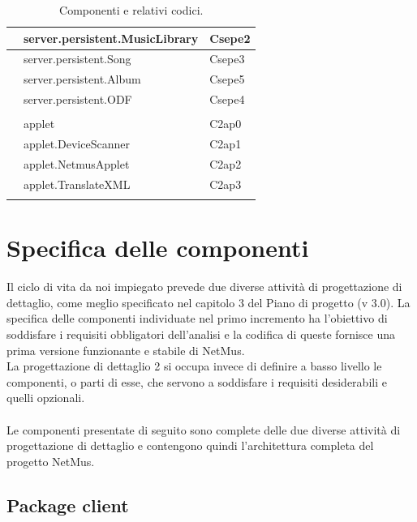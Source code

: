 \begin{footnotesize}
\begin{longtable}[h]{|l|l|l|}
& server.persistent.MusicLibrary  &  Csepe2 \\\hline 
& server.persistent.Song  &  Csepe3 \\\hline 
\bo{+} & server.persistent.Album  &  Csepe5 \\\hline 
\bo{+} & server.persistent.ODF  &  Csepe4 \\\hline 
&&\\\hline
\bo{+} & applet  &  C2ap0 \\\hline
\bo{+} & applet.DeviceScanner  &  C2ap1 \\\hline
\bo{+} & applet.NetmusApplet  &  C2ap2 \\\hline
\bo{+} & applet.TranslateXML  &  C2ap3 \\\hline
\caption{Componenti e relativi codici.}
\centering
\end{longtable}
\end{footnotesize}

\chapter{Specifica delle componenti}
\thispagestyle{fancy} %
Il ciclo di vita da noi impiegato prevede due diverse attivit\`a di
progettazione di dettaglio, come meglio specificato nel capitolo 3 del Piano di progetto (v 3.0). La specifica
delle componenti individuate nel primo incremento ha l'obiettivo di soddisfare i
requisiti obbligatori dell'analisi e la codifica di
queste fornisce una prima versione funzionante e stabile di NetMus. \\
La progettazione di dettaglio 2 si occupa invece di definire a basso livello le
componenti, o parti di esse, che servono a soddisfare i requisiti desiderabili e
quelli opzionali.\\\\
Le componenti presentate di seguito sono complete delle due diverse attivit\`a
di progettazione di dettaglio e contengono quindi l'architettura completa del
progetto NetMus.

\newpage
\section{Package client}

